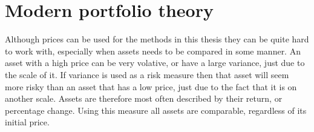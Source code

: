 \documentclass[12pt, oneside]{book}\usepackage{knitr}
\begin{document}
{\chapter{Modern portfolio theory}\label{ch:MPT}


Although prices can be used for the methods in this thesis they can be quite hard to work with, especially when assets needs to be compared in some manner. 
An asset with a high price can be very volative, or have a large variance, just due to the scale of it. 
If variance is used as a risk measure then that asset will seem more risky than an asset that has a low price, just due to the fact that it is on another scale.
Assets are therefore most often described by their return, or percentage change.
Using this measure all assets are comparable, regardless of its initial price.

}
\end{document}

